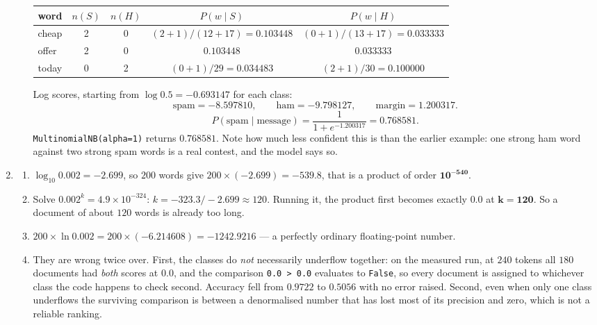 \documentclass[11pt]{article}
\begin{document}
\begin{enumerate}[leftmargin=*, itemsep=0.7em]
\begin{enumerate}[label=(\alph*)]
      \begin{center}\small
      \begin{tabular}{@{}lcccc@{}}
      \toprule
      word & $n(S)$ & $n(H)$ & $P(w \mid S)$ & $P(w \mid H)$\\
      \midrule
      cheap & 2 & 0 & $(2{+}1)/(12{+}17) = 0.103448$ &
        $(0{+}1)/(13{+}17) = 0.033333$\\
      offer & 2 & 0 & $0.103448$ & $0.033333$\\
      today & 0 & 2 & $(0{+}1)/29 = 0.034483$ & $(2{+}1)/30 = 0.100000$\\
      \bottomrule
      \end{tabular}
      \end{center}

      Log scores, starting from $\log 0.5 = -0.693147$ for each class:
      \[
        \text{spam} = \mathbf{-8.597810}, \qquad
        \text{ham}  = \mathbf{-9.798127}, \qquad
        \text{margin} = 1.200317 .
      \]
      \[
        P(\text{spam} \mid \text{message})
          = \frac{1}{1 + e^{-1.200317}} = \mathbf{0.768581}.
      \]
      \texttt{MultinomialNB(alpha=1)} returns $0.768581$. Note how much less
      confident this is than the earlier example: one strong ham word against
      two strong spam words is a real contest, and the model says so.
  \end{enumerate}

\item
  \begin{enumerate}[label=(\alph*)]
    \item $\log_{10} 0.002 = -2.699$, so $200$ words give
      $200 \times (-2.699) = -539.8$, that is a product of order
      $\mathbf{10^{-540}}$.
    \item Solve $0.002^{k} = 4.9 \times 10^{-324}$:
      $k = -323.3 / -2.699 \approx 120$. Running it, the product first
      becomes exactly $0.0$ at $\mathbf{k = 120}$. So a document of about
      $120$ words is already too long.
    \item $200 \times \ln 0.002 = 200 \times (-6.214608) =
      \mathbf{-1242.9216}$ --- a perfectly ordinary floating-point number.
    \item They are wrong twice over. First, the classes do \emph{not}
      necessarily underflow together: on the measured run, at $240$ tokens
      all $180$ documents had \emph{both} scores at $0.0$, and the comparison
      \texttt{0.0 > 0.0} evaluates to \texttt{False}, so every document is
      assigned to whichever class the code happens to check second.
      Accuracy fell from $\mathbf{0.9722}$ to $\mathbf{0.5056}$ with no error
      raised. Second, even when only one class underflows the surviving
      comparison is between a denormalised number that has lost most of its
      precision and zero, which is not a reliable ranking.
  \end{enumerate}


\end{enumerate}
\end{document}
